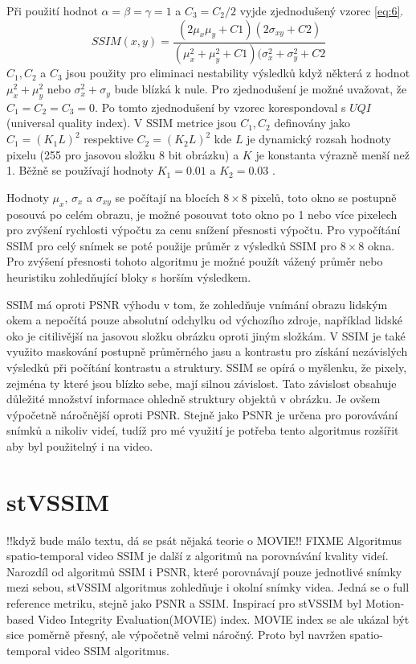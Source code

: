 \documentclass[thesis=M,czech]{FITthesis}[2016/06/26]
\begin{document}
Při použití hodnot $\alpha = \beta = \gamma = 1$ a $C_3=C_2/2$ \cite{SSIM1} vyjde zjednodušený vzorec \ref{eq:6}.
\begin{equation}\label{eq:6}
\mathit{SSIM}(x, y) = \frac{(2 \mu_x \mu_y + C1) (2 \sigma_{xy} + C2)}{(\mu_x^2+\mu_y^2+C1)(\sigma_x^2+\sigma_y^2+C2}
\end{equation}
$C_1, C_2$ a $C_3$ jsou použity pro eliminaci nestability výsledků když některá z hodnot $\mu_x^2+\mu_y^2$ nebo $\sigma_x^2+\sigma_y$ bude blízká k nule. Pro zjednodušení je možné uvažovat, že $C_1=C_2=C_3=0$. Po tomto zjednodušení by vzorec korespondoval s $\mathit{UQI}$(universal quality index). V SSIM metrice jsou $C_1, C_2$ definovány jako $C_1=(K_1L)^2$ respektive $C_2=(K_2L)^2$ kde $L$ je dynamický rozsah hodnoty pixelu (255 pro jasovou složku 8 bit obrázku) a $K$ je konstanta výrazně menší než 1. Běžně se používají hodnoty $K_1=0.01$ a $K_2=0.03$ \cite{SSIM2}.

Hodnoty $\mu_x$, $\sigma_x$ a $\sigma_{xy}$ se počítají na blocích $8\times8$ pixelů, toto okno se postupně posouvá po celém obrazu, je možné posouvat toto okno po 1 nebo více pixelech pro zvýšení rychlosti výpočtu za cenu snížení přesnosti výpočtu.
Pro vypočítání SSIM pro celý snímek se poté použije průměr z výsledků SSIM pro $8\times8$ okna. Pro zvýšení přesnosti tohoto algoritmu je možné použít vážený průměr nebo heuristiku zohledňující bloky s horším výsledkem\cite{stvssim}.

SSIM má oproti PSNR výhodu v tom, že zohledňuje vnímání obrazu lidským okem a nepočítá pouze absolutní odchylku od výchozího zdroje, například lidské oko je citilivější na jasovou složku obrázku oproti jiným složkám. V SSIM je také využito maskování postupně průměrného jasu a kontrastu pro získání nezávislých výsledků při počítání kontrastu a struktury. SSIM se opírá o myšlenku, že pixely, zejména ty které jsou blízko sebe, mají silnou závislost. Tato závislost obsahuje důležité množství informace ohledně struktury objektů v obrázku.
Je ovšem výpočetně náročnější oproti PSNR. Stejně jako PSNR je určena pro porovávání snímků a nikoliv videí, tudíž pro mé využití je potřeba tento algoritmus rozšířit aby byl použitelný i na video.

\section{stVSSIM}
!!když bude málo textu, dá se psát nějaká teorie o MOVIE!! FIXME
Algoritmus spatio-temporal video SSIM\cite{stvssim} je další z algoritmů na porovnávání kvality videí. Narozdíl od algoritmů SSIM i PSNR, které porovnávají pouze jednotlivé snímky mezi sebou, stVSSIM algoritmus zohledňuje i okolní snímky videa. Jedná se o full reference metriku, stejně jako PSNR a SSIM. Inspirací pro stVSSIM byl Motion-based Video Integrity Evaluation(MOVIE) index\cite{MOVIE}. MOVIE index se ale ukázal být sice poměrně přesný, ale výpočetně velmi náročný. Proto byl navržen spatio-temporal video SSIM algoritmus. 
\end{document}

